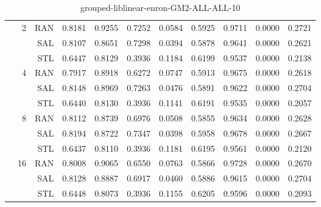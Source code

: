 \begin{center}
\begin{table}[htbp]
\begin{center}
\begin{tabular}{ | r | r | r | r | r | r | r | r | r | r | r |}
 & \multirow{3}{*}{2} & RAN & 0.8181 & 0.9255 & 0.7252 & 0.0584 & 0.5925 & 0.9711 & 0.0000 & 0.2721\\ \cline{3-11}
 &   & SAL & 0.8107 & 0.8651 & 0.7298 & 0.0394 & 0.5878 & 0.9641 & 0.0000 & 0.2621\\ \cline{3-11}
 &   & STL & 0.6447 & 0.8129 & 0.3936 & 0.1184 & 0.6199 & 0.9537 & 0.0000 & 0.2138\\ \cline{2-11}
 & \multirow{3}{*}{4} & RAN & 0.7917 & 0.8918 & 0.6272 & 0.0747 & 0.5913 & 0.9675 & 0.0000 & 0.2618\\ \cline{3-11}
 &   & SAL & 0.8148 & 0.8969 & 0.7263 & 0.0476 & 0.5891 & 0.9622 & 0.0000 & 0.2704\\ \cline{3-11}
 &   & STL & 0.6440 & 0.8130 & 0.3936 & 0.1141 & 0.6191 & 0.9535 & 0.0000 & 0.2057\\ \cline{2-11}
 & \multirow{3}{*}{8} & RAN & 0.8112 & 0.8739 & 0.6976 & 0.0508 & 0.5855 & 0.9634 & 0.0000 & 0.2628\\ \cline{3-11}
 &   & SAL & 0.8194 & 0.8722 & 0.7347 & 0.0398 & 0.5958 & 0.9678 & 0.0000 & 0.2667\\ \cline{3-11}
 &   & STL & 0.6437 & 0.8110 & 0.3936 & 0.1181 & 0.6195 & 0.9561 & 0.0000 & 0.2120\\ \cline{2-11}
 & \multirow{3}{*}{16} & RAN & 0.8008 & 0.9065 & 0.6550 & 0.0763 & 0.5866 & 0.9728 & 0.0000 & 0.2670\\ \cline{3-11}
 &   & SAL & 0.8128 & 0.8887 & 0.6917 & 0.0460 & 0.5886 & 0.9615 & 0.0000 & 0.2704\\ \cline{3-11}
 &   & STL & 0.6448 & 0.8073 & 0.3936 & 0.1155 & 0.6205 & 0.9596 & 0.0000 & 0.2093\\ \cline{2-11}
\hline
\end{tabular}
\caption{grouped-liblinear-enron-GM2-ALL-ALL-10}
\end{center}
 \end{table}
\end{center}

